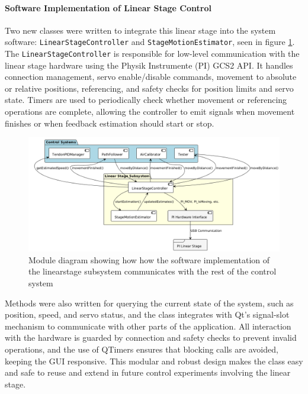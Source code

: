 \paragraph*{Software Implementation of Linear Stage Control}
Two new classes were written to integrate this linear stage into the system software: \texttt{LinearStageController} and \texttt{StageMotionEstimator}, seen in figure \ref{fig:linearsoftware}. The \texttt{LinearStageController} is responsible for low-level communication with the linear stage hardware using the Physik Instrumente (PI) GCS2 API. It handles connection management, servo enable/disable commands, movement to absolute or relative positions, referencing, and safety checks for position limits and servo state. Timers are used to periodically check whether movement or referencing operations are complete, allowing the controller to emit signals when movement finishes or when feedback estimation should start or stop.
\begin{figure}[H]
    \centering
    \includegraphics[width=\linewidth]{images/Software documentation/linearstage.png}
    \caption{Module diagram showing how how the software implementation of the linearstage subsystem communicates with the rest of the control system}
    \label{fig:linearsoftware}
\end{figure}
Methods were also written for querying the current state of the system, such as position, speed, and servo status, and the class integrates with Qt’s signal-slot mechanism to communicate with other parts of the application. All interaction with the hardware is guarded by connection and safety checks to prevent invalid operations, and the use of QTimers ensures that blocking calls are avoided, keeping the GUI responsive. This modular and robust design makes the class easy and safe to  reuse and extend in future control experiments involving the linear stage.


